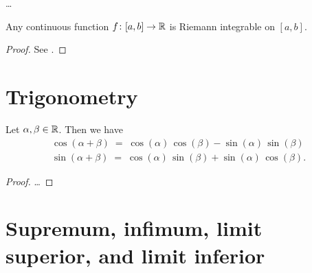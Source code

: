 \begin{definition}
  \label{def:riemann_integral}
  \ldots
\end{definition}

\begin{lemma}
  \label{lem:continuous_implies_riemann_integrable}
  Any continuous function $f \colon [a,b] \to \mathbb{R}$ is Riemann
  integrable on $[a,b]$.
\end{lemma}
\begin{proof}
  See \MetSpCourse{}.
\end{proof}



\section{Trigonometry}

\begin{lemma}
  \label{lem:trigonometric_angle_sum}
  Let $\alpha, \beta \in \mathbb{R}$. Then we have
  \begin{align*}
    \cos (\alpha + \beta) \; = \; \cos (\alpha) \, \cos (\beta) - \sin (\alpha) \, \sin (\beta) \\
    \sin (\alpha + \beta) \; = \; \cos (\alpha) \, \sin (\beta) + \sin (\alpha) \, \cos (\beta) .
  \end{align*}
\end{lemma}
\begin{proof}
  \ldots
\end{proof}



\section{Supremum, infimum, limit superior, and limit inferior}

